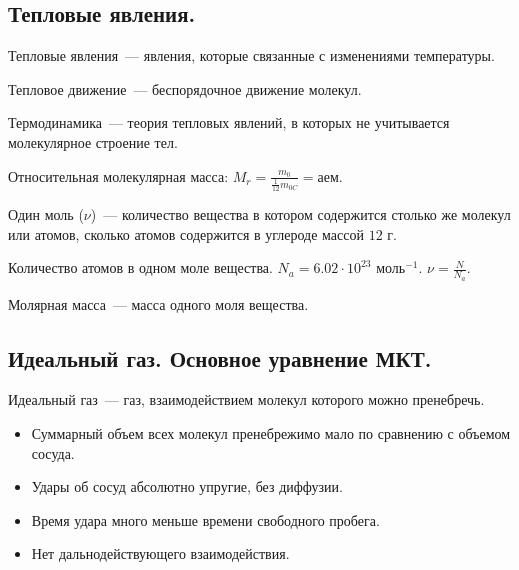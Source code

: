 \documentclass{article}
\begin{document}
	\subsection{Тепловые явления.}
	\begin{definition}
		Тепловые явления~--- явления, которые связанные с изменениями температуры.
	\end{definition}
	\begin{definition}
		Тепловое движение~--- беспорядочное движение молекул.
	\end{definition}
	\begin{definition}
		Термодинамика~--- теория тепловых явлений, в которых не учитывается молекулярное строение тел.
	\end{definition}
	\begin{definition}
		Относительная молекулярная масса: $M_r = \frac{m_0}{\frac{1}{12} m_{0C}} = \text{аем}$.
	\end{definition}
	\begin{definition}
		Один моль ($\nu$)~--- количество вещества в котором содержится столько же молекул или атомов, сколько атомов содержится в углероде массой $12$ г.
	\end{definition}
	\begin{definition}
		Количество атомов в одном моле вещества. $N_a = 6.02 \cdot 10^{23} \text{ моль}^{-1}$. $\nu = \frac{N}{N_a}$.
	\end{definition}
	\begin{definition}
		Молярная масса~--- масса одного моля вещества.
	\end{definition}
	\subsection{Идеальный газ. Основное уравнение МКТ.}
	\begin{definition}
		Идеальный газ~--- газ, взаимодействием молекул которого можно пренебречь.
		\begin{itemize}
			\item Суммарный объем всех молекул пренебрежимо мало по сравнению с объемом сосуда.
			\item Удары об сосуд абсолютно упругие, без диффузии.
			\item Время удара много меньше времени свободного пробега.
			\item Нет дальнодействующего взаимодействия.
		\end{itemize}
	\end{definition}
\end{document}
